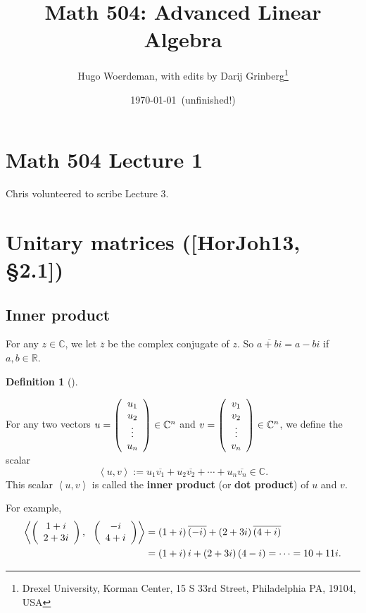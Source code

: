 \documentclass[numbers=enddot,12pt,final,onecolumn,notitlepage]{scrartcl}%
\numberwithin{exer}{subsection}
\theoremstyle{definition}
\newtheorem{defi}[theo]{Definition}
\newenvironment{definition}[1][]
{\begin{defi}[#1]\begin{leftbar}}
{\end{leftbar}\end{defi}}
\begin{document}
\title{Math 504: Advanced Linear Algebra}
\author{Hugo Woerdeman, with edits by Darij Grinberg\thanks{Drexel University, Korman
Center, 15 S 33rd Street, Philadelphia PA, 19104, USA}}
\date{\today\ (unfinished!)}
\maketitle
\tableofcontents

\section*{Math 504 Lecture 1}

Chris volunteered to scribe Lecture 3.

\section{Unitary matrices ([HorJoh13, \S 2.1])}

\subsection{Inner product}

For any $z\in\mathbb{C}$, we let $\overline{z}$ be the complex conjugate of
$z$. So $\overline{a+bi}=a-bi$ if $a,b\in\mathbb{R}$. 

\begin{definition}
For any two vectors $u=\left(
\begin{array}
[c]{c}%
u_{1}\\
u_{2}\\
\vdots\\
u_{n}%
\end{array}
\right)  \in\mathbb{C}^{n}$ and $v=\left(
\begin{array}
[c]{c}%
v_{1}\\
v_{2}\\
\vdots\\
v_{n}%
\end{array}
\right)  \in\mathbb{C}^{n}$, we define the scalar%
\[
\left\langle u,v\right\rangle :=u_{1}\overline{v_{1}}+u_{2}\overline{v_{2}%
}+\cdots+u_{n}\overline{v_{n}}\in\mathbb{C}.
\]
This scalar $\left\langle u,v\right\rangle $ is called the \textbf{inner
product} (or \textbf{dot product}) of $u$ and $v$.
\end{definition}

For example,%
\begin{align*}
\left\langle \left(
\begin{array}
[c]{c}%
1+i\\
2+3i
\end{array}
\right)  ,\ \ \left(
\begin{array}
[c]{c}%
-i\\
4+i
\end{array}
\right)  \right\rangle  & =\left(  1+i\right)  \overline{\left(  -i\right)
}+\left(  2+3i\right)  \overline{\left(  4+i\right)  }\\
& =\left(  1+i\right)  i+\left(  2+3i\right)  \left(  4-i\right)
=\cdots=10+11i.
\end{align*}
\end{document}
